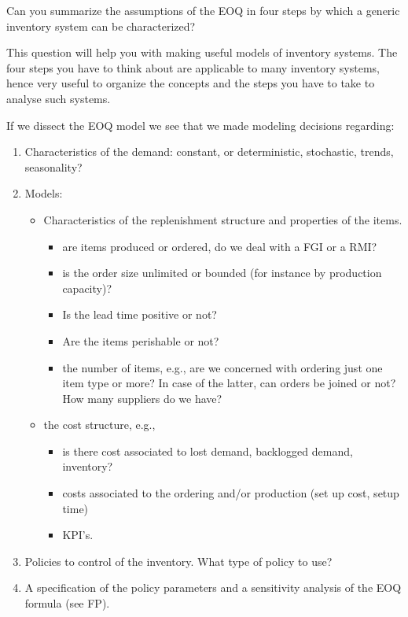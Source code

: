 \begin{question}
  Can you summarize the assumptions of the EOQ in four steps by which
  a generic inventory system can be characterized?

  This question will help you with making useful models of inventory
  systems. The four steps you have to think about are applicable to
  many inventory systems, hence very useful to organize the concepts
  and the steps you have to take to analyse such systems.

  \begin{solution}
If we dissect the EOQ model we see that we made modeling decisions regarding:
\begin{enumerate}
\item Characteristics of the  demand:  constant, or deterministic, stochastic, trends, seasonality?
\item Models: 
  \begin{itemize}
  \item Characteristics of the replenishment structure and properties
    of the items.
  \begin{itemize}
  \item  are items produced or ordered, do we deal with a FGI or a RMI? 
  \item is the order size unlimited or bounded (for instance by
    production capacity)? 
  \item Is the lead time positive or not?
  \item Are the items perishable or not?
  \item the number of items, e.g., are we concerned with ordering just
  one item type or more? In case of the latter, can orders be joined
  or not? How many suppliers do we have?
  \end{itemize}
\item the cost structure, e.g., 
  \begin{itemize}
  \item is there cost associated to lost  demand, backlogged demand, inventory?
  \item costs associated to the ordering and/or production (set up
    cost, setup time)
  \item KPI's.
  \end{itemize}
\end{itemize}
\item Policies to control of the inventory. What type of policy to use? 
\item A specification of the policy parameters and a sensitivity
  analysis of the EOQ formula (see FP).
\end{enumerate}
  \end{solution}
\end{question}

